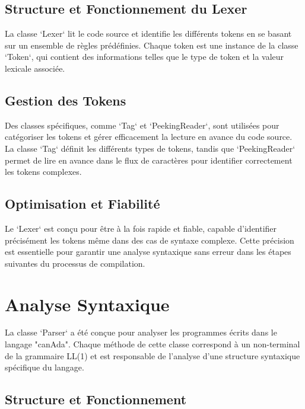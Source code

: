 \documentclass[french,a4paper]{article}
\begin{document}
    \subsection{Structure et Fonctionnement du Lexer}\label{subsec:structure-et-fonctionnement-du-lexer}

    La classe `Lexer` lit le code source et identifie les différents tokens en se basant sur un ensemble de règles prédéfinies. Chaque token est une instance de la classe `Token`, qui contient des informations telles que le type de token et la valeur lexicale associée.

    \subsection{Gestion des Tokens}\label{subsec:gestion-des-tokens}

    Des classes spécifiques, comme `Tag` et `PeekingReader`, sont utilisées pour catégoriser les tokens et gérer efficacement la lecture en avance du code source. La classe `Tag` définit les différents types de tokens, tandis que `PeekingReader` permet de lire en avance dans le flux de caractères pour identifier correctement les tokens complexes.

    \subsection{Optimisation et Fiabilité}\label{subsec:optimisation-et-fiabilite}

    Le `Lexer` est conçu pour être à la fois rapide et fiable, capable d'identifier précisément les tokens même dans des cas de syntaxe complexe. Cette précision est essentielle pour garantir une analyse syntaxique sans erreur dans les étapes suivantes du processus de compilation.

    \section{Analyse Syntaxique}\label{sec:analyse-syntaxique}

    La classe `Parser` a été conçue pour analyser les programmes écrits dans le langage "canAda". Chaque méthode de cette classe correspond à un non-terminal de la grammaire LL(1) et est responsable de l'analyse d'une structure syntaxique spécifique du langage.

    \subsection{Structure et Fonctionnement}\label{subsec:structure-et-fonctionnement}
\end{document}
